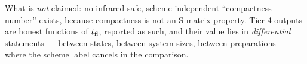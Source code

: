 What is \emph{not} claimed: no infrared-safe, scheme-independent
``compactness number'' exists, because compactness is not an
S-matrix property.  Tier 4 outputs are honest functions of
$t_{\rm fl}$, reported as such, and their value lies in
\emph{differential} statements --- between states, between system
sizes, between preparations --- where the scheme label cancels in the
comparison.